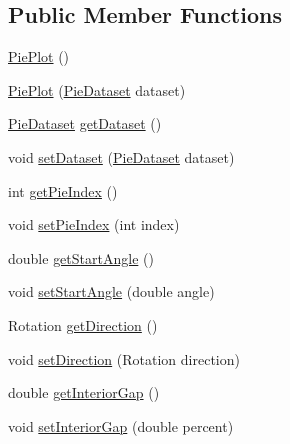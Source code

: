 \subsection*{Public Member Functions}
\begin{DoxyCompactItemize}
\item 
\mbox{\hyperlink{classorg_1_1jfree_1_1chart_1_1plot_1_1_pie_plot_a9d245d7042da8b6b426e791bbf5bbaa1}{Pie\+Plot}} ()
\item 
\mbox{\hyperlink{classorg_1_1jfree_1_1chart_1_1plot_1_1_pie_plot_a0d79a40a249d550272ccab1ec574d494}{Pie\+Plot}} (\mbox{\hyperlink{interfaceorg_1_1jfree_1_1data_1_1general_1_1_pie_dataset}{Pie\+Dataset}} dataset)
\item 
\mbox{\hyperlink{interfaceorg_1_1jfree_1_1data_1_1general_1_1_pie_dataset}{Pie\+Dataset}} \mbox{\hyperlink{classorg_1_1jfree_1_1chart_1_1plot_1_1_pie_plot_a9216c489ef9e69e91dfc3207b7ab80bb}{get\+Dataset}} ()
\item 
void \mbox{\hyperlink{classorg_1_1jfree_1_1chart_1_1plot_1_1_pie_plot_a2be3213da3debc6defe8e1ab9f531194}{set\+Dataset}} (\mbox{\hyperlink{interfaceorg_1_1jfree_1_1data_1_1general_1_1_pie_dataset}{Pie\+Dataset}} dataset)
\item 
int \mbox{\hyperlink{classorg_1_1jfree_1_1chart_1_1plot_1_1_pie_plot_a455d67f5bfb17e8fbbd592ca573916fa}{get\+Pie\+Index}} ()
\item 
void \mbox{\hyperlink{classorg_1_1jfree_1_1chart_1_1plot_1_1_pie_plot_a9d05917a58c4ccab100f948d81f3d3be}{set\+Pie\+Index}} (int index)
\item 
double \mbox{\hyperlink{classorg_1_1jfree_1_1chart_1_1plot_1_1_pie_plot_a71e04a3186bbc4c22788ae6a04853734}{get\+Start\+Angle}} ()
\item 
void \mbox{\hyperlink{classorg_1_1jfree_1_1chart_1_1plot_1_1_pie_plot_a66d094282ec15d23beac9147c45eb213}{set\+Start\+Angle}} (double angle)
\item 
Rotation \mbox{\hyperlink{classorg_1_1jfree_1_1chart_1_1plot_1_1_pie_plot_a5406b9adefa8fa24d4328cf9c652abce}{get\+Direction}} ()
\item 
void \mbox{\hyperlink{classorg_1_1jfree_1_1chart_1_1plot_1_1_pie_plot_a771df380edf05a0b83596b7b82002856}{set\+Direction}} (Rotation direction)
\item 
double \mbox{\hyperlink{classorg_1_1jfree_1_1chart_1_1plot_1_1_pie_plot_a15a41ce0f9505c82aa6f935e10886e8e}{get\+Interior\+Gap}} ()
\item 
void \mbox{\hyperlink{classorg_1_1jfree_1_1chart_1_1plot_1_1_pie_plot_ae35995953830e84173411620ffa8549d}{set\+Interior\+Gap}} (double percent)

\end{DoxyCompactItemize}
